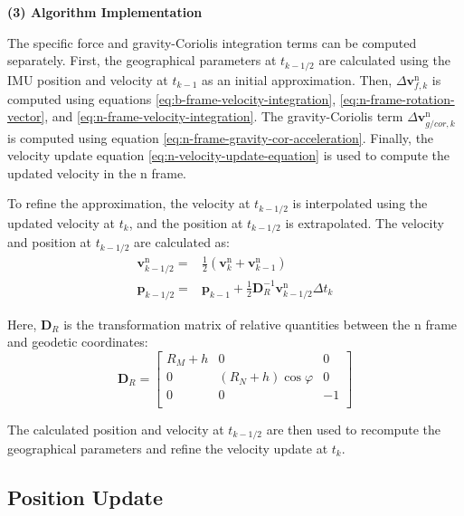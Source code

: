 \documentclass{article}
\begin{document}
\textbf{(3) Algorithm Implementation}

The specific force and gravity-Coriolis integration terms can be computed separately. First, the geographical parameters at $t_{k-1/2}$ are calculated using the IMU position and velocity at $t_{k-1}$ as an initial approximation. Then, $\Delta \boldsymbol{v}_{f,k}^{\mathrm{n}}$ is computed using equations \eqref{eq:b-frame-velocity-integration}, \eqref{eq:n-frame-rotation-vector}, and \eqref{eq:n-frame-velocity-integration}. The gravity-Coriolis term $\Delta \boldsymbol{v}_{g/cor,k}^{\mathrm{n}}$ is computed using equation \eqref{eq:n-frame-gravity-cor-acceleration}. Finally, the velocity update equation \eqref{eq:n-velocity-update-equation} is used to compute the updated velocity in the $\mathrm{n}$ frame.

To refine the approximation, the velocity at $t_{k-1/2}$ is interpolated using the updated velocity at $t_k$, and the position at $t_{k-1/2}$ is extrapolated. The velocity and position at $t_{k-1/2}$ are calculated as:
\begin{equation}
    \begin{aligned}
        \boldsymbol{v}_{k-1/2}^{\mathrm{n}} =& \frac{1}{2} \left(\boldsymbol{v}_{k}^{\mathrm{n}} + \boldsymbol{v}_{k-1}^{\mathrm{n}} \right) \\
        \boldsymbol{p}_{k-1/2} = & \boldsymbol{p}_{k-1} + \frac{1}{2} \boldsymbol{D}_{R}^{-1} \boldsymbol{v}_{k-1/2}^{\mathrm{n}} \Delta t_k
    \end{aligned}
    \label{eq:velocity-position-interpolate-extrapolate}
\end{equation}

Here, $\boldsymbol{D}_{R}$ is the transformation matrix of relative quantities between the $\mathrm{n}$ frame and geodetic coordinates:
\begin{equation}
    \boldsymbol{D}_{{R}}=\left[ \begin{matrix}
        {R}_{{M}}+{h}&		0&		0\\
        0&		\left( {R}_{{N}}+{h} \right) \cos \varphi&		0\\
        0&		0&		-1\\
    \end{matrix} \right] 
\end{equation}

The calculated position and velocity at $t_{k-1/2}$ are then used to recompute the geographical parameters and refine the velocity update at $t_k$.


\subsection{Position Update}
\end{document}
